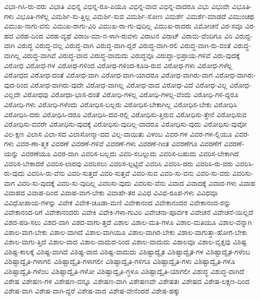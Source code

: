 {ವಿಭಾ-ಗಿಸಿ-ರು-ವರು
ವಿಭಾತಿ
ವಿಭಿನ್ನ
ವಿಭಿನ್ನ-ರೂ-ಪಿಯೂ
ವಿಭಿನ್ನ-ವಾದ
ವಿಭಿನ್ನ-ವಾದರೂ
ವಿಭು
ವಿಭುವೇ
ವಿಭೂತಿ-ಗಳು
ವಿಭೂತಿ-ಗಳೆಲ್ಲ
ವಿಮರ್ಶಿ-ಸು-ತ್ತಿಲ್ಲ
ವಿಮರ್ಶಿ-ಸುವ
ವಿಮರ್ಶಿ-ಸೋಣ
ವಿಮರ್ಶೆ
ವಿಮರ್ಶೆ-ಮಾಡದೆ
ವಿಮುಂಚಥ
ವಿಮುಖ-ನಾಗು-ವನು
ವಿಮುಖ-ರಾಗು-ವಿರಿ
ವಿಮುಖ-ರಾ-ಗು-ವುದಿಲ್ಲ
ವಿಮುಖ-ರಾದರು
ವಿಮೋಚನೆ
ವಿರ-ಸವೂ
ವಿರ-ಹದ
ವಿರಹ-ದಿಂದ
ವಿರಹ-ವ್ಯಥೆ
ವಿರಾಜ-ಮಾ-ನ-ಳಾಗಿ-ರುವಳು
ವಿರಾಟನ
ವಿರಾಟ್
ವಿರಾಮ-ವೆಂದಿಗೂ
ವಿರಿ
ವಿರುದ್ದ-ವಾಗಿ
ವಿರುದ್ಧ
ವಿರುದ್ಧ-ವಲ್ಲ
ವಿರುದ್ಧ-ವಾಗಿ
ವಿರುದ್ಧ-ವಾಗಿ-ದ್ದರೆ
ವಿರುದ್ಧ-ವಾಗಿ-ರಲಿ
ವಿರುದ್ಧ-ವಾಗಿ-ರು-ವಂತೆ
ವಿರುದ್ಧ-ವಾಗಿಲ್ಲ
ವಿರುದ್ಧ-ವಾಗಿವೆ
ವಿರುದ್ಧ-ವಾದ
ವಿರುದ್ಧ-ವಾದುದು
ವಿರುದ್ಧವೂ
ವಿರುದ್ಧಾ-ಭಿಪ್ರಾಯ-ಗಳಿವೆ
ವಿರು-ವುದಕ್ಕೆ
ವಿರೋಧ
ವಿರೋಧ-ಗಳ
ವಿರೋಧ-ಗಳಿಂದ
ವಿರೋಧ-ಗಳಿಂದ-ಕೂಡಿ-ರುವ
ವಿರೋಧ-ಗಳು
ವಿರೋಧ-ಗಳೆಲ್ಲ
ವಿರೋಧದ
ವಿರೋಧ-ದಂತೆ
ವಿರೋಧ-ವಾಗಿ
ವಿರೋಧ-ವಾಗಿ-ಯಾದರೂ
ವಿರೋಧ-ವಾಗಿರು-ವಾಗ
ವಿರೋಧ-ವಾಗಿರು-ವುದ-ರಿಂದ
ವಿರೋಧ-ವಾಗಿರು-ವುದೇ
ವಿರೋಧ-ವಾಗಿಲ್ಲ
ವಿರೋಧ-ವಾದ
ವಿರೋಧ-ವಿದೆ
ವಿರೋಧ-ವಿಲ್ಲ
ವಿರೋಧ-ವಿಲ್ಲದೇ
ವಿರೋಧವು
ವಿರೋಧಾ-ಭಾಸ-ದಂತೆ
ವಿರೋಧಿ-ಗಳಲ್ಲ
ವಿರೋಧಿ-ಗಳಲ್ಲ-ವೆಂದು
ವಿರೋಧಿ-ಗಳಿ-ದ್ದರೂ
ವಿರೋಧಿ-ಗಳು
ವಿರೋಧಿ-ಗಳೆಂದು
ವಿರೋಧಿಸ-ಬಲ್ಲರು
ವಿರೋಧಿಸ-ಬೇಕಾಗಿಲ್ಲ
ವಿರೋಧಿಸ-ಬೇಕು
ವಿರೋಧಿಸಿ
ವಿರೋಧಿಸಿ-ದರು
ವಿರೋಧಿಸಿ-ದರೂ
ವಿರೋಧಿಸಿ-ದವ-ರಲ್ಲಿ
ವಿರೋಧಿಸು-ತ್ತಿರುವ
ವಿರೋಧಿಸು-ತ್ತೇನೆ
ವಿರೋಧಿಸುವ
ವಿರೋಧಿಸು-ವವರೇ
ವಿರೋಧಿಸು-ವುದಕ್ಕೆ
ವಿರೋಧಿಸು-ವುದಿಲ್ಲ-ವಾದರೂ
ವಿರೋಧಿಸು-ವುದು
ವಿರೋಧಿಸು-ವುವೋ
ವಿಲ-ಕ್ಷಣ
ವಿಲಾಸ
ವಿಲಾ-ಸದ
ವಿಲಾಸೋನ್ಮಾ-ದದ
ವಿಲ್ಲ-ವಾಯಿತು
ವಿಳಂಬ
ವಿವರ-ಗಳ
ವಿವರ-ಗಳ-ಲ್ಲಿಯೂ
ವಿವರ-ಗಳು
ವಿವರ-ಣಾ-ತ್ಮಕ
ವಿವರಣೆ
ವಿವರಣೆ-ಗಳಿವೆ
ವಿವರಣೆ-ಗಳು
ವಿವರಣೆ-ಗಿಂತ
ವಿವರಣೆಗೂ
ವಿವರಣೆಗೆ
ವಿವರಣೆ-ಯನ್ನು
ವಿವರಣೆಯೂ
ವಿವರ-ವಾಗಿ
ವಿವರಿಸ-ಬಲ್ಲದು
ವಿವರಿ-ಸಬಲ್ಲುದು
ವಿವರಿಸ-ಬಹುದು
ವಿವರಿಸ-ಬೇಕಾಗಿದೆ
ವಿವರಿಸ-ಬೇಕಾದರೆ
ವಿವರಿಸ-ಲಾರವು
ವಿವರಿಸಲು
ವಿವರಿಸ-ಲ್ಪಟ್ಟಿವೆ
ವಿವರಿಸಿ
ವಿವರಿಸಿ-ದರು
ವಿವರಿಸಿ-ರು-ವರು
ವಿವರಿಸಿ-ರು-ವುದು
ವಿವರಿಸಿ-ರು-ವೆನು
ವಿವರಿ-ಸುತ್ತದೆ
ವಿವರಿ-ಸುತ್ತವೆ
ವಿವರಿ-ಸುವ
ವಿವರಿ-ಸು-ವನು
ವಿವರಿ-ಸು-ವರು
ವಿವರಿಸು-ವಾಗ
ವಿವರಿ-ಸು-ವುದಕ್ಕೆ
ವಿವರಿ-ಸು-ವುದಿಲ್ಲ
ವಿವರಿಸು-ವುದು
ವಿವರಿಸು-ವೆನು
ವಿವಾದ
ವಿವಾದಕ್ಕೆ
ವಿವಾದ-ಗಳು
ವಿವಾಹ
ವಿವಾಹದ
ವಿವಾಹ-ದಿಂದ
ವಿವಾಹ-ವಾಗ-ಬೇಕು
ವಿವಾಹೇ-ತರ
ವಿವಿಧ
ವಿವಿಧ-ರೂಪ-ಗಳು
ವಿವಿಧವೂ
ವಿವಿಧೋಪಾಯ-ಗಳನ್ನು
ವಿವೇಕ
ವಿವೇಕ-ಚೂಡಾ-ಮಣಿ
ವಿವೇಕಾನಂದ
ವಿವೇಕಾನಂದರ
ವಿವೇಕಾನಂದ-ರನ್ನು
ವಿವೇಕಾನಂದ-ರಿಗೆ
ವಿವೇಕಾನಂದರು
ವಿವೇಕಿ
ವಿವೇಕಿ-ಗಳಾ-ಗುವಿರಿ
ವಿವೇಚನಾ-ಪೂರ್ವಕ
ವಿವೇಚನೆ
ವಿವೇಚನೆ-ಯಿಲ್ಲದೆ
ವಿಶದ-ಪಡಿ-ಸಲು
ವಿಶದ-ವಾಗಿ
ವಿಶದ-ವಾಗು-ತ್ತದೆ
ವಿಶಾಲ
ವಿಶಾಲ-ಮತಿ-ಗಳೂ
ವಿಶಾಲ-ಮತಿಯೂ
ವಿಶಾಲ-ವನ್ನಾಗಿ
ವಿಶಾಲ-ವಾಗ-ಬೇಕು
ವಿಶಾಲ-ವಾಗಿದೆ
ವಿಶಾಲ-ವಾಗಿಯೂ
ವಿಶಾಲ-ವಾಗಿರ-ಬೇಕು
ವಿಶಾಲ-ವಾಗುತ್ತಾ-ಹೋಗ-ಬೇಕು
ವಿಶಾಲ-ವಾಗು-ತ್ತಿದೆ
ವಿಶಾಲ-ವಾದ
ವಿಶಾಲ-ವಾದುದ-ರಿಂದ
ವಿಶಾಲ-ವಾದುದು
ವಿಶಾಲವೂ
ವಿಶಾಲ-ವೃಕ್ಷವು
ವಿಶಿಷ್ಟ
ವಿಶಿಷ್ಟ-ಕಾಲಕ್ಕೆ
ವಿಶಿಷ್ಟ-ವಾಗಿದೆ
ವಿಶಿಷ್ಟ-ವಾದ
ವಿಶಿಷ್ಟ-ವಾದುದು
ವಿಶಿಷ್ಟಾದ್ವೈತ
ವಿಶಿಷ್ಟಾದ್ವೈತ-ಗಳ
ವಿಶಿಷ್ಟಾದ್ವೈತ-ಗಳೆಂಬ
ವಿಶಿಷ್ಟಾದ್ವೈತಿ-ಗಳಾಗಲಿ
ವಿಶಿಷ್ಟಾದ್ವೈತಿ-ಗಳಾಗಲೀ
ವಿಶಿಷ್ಟಾದ್ವೈತಿ-ಗಳಿಗೂ
ವಿಶಿಷ್ಟಾದ್ವೈತಿ-ಗಳು
ವಿಶಿಷ್ಟಾದ್ವೈತಿ-ಗಳೂ
ವಿಶಿಷ್ಟಾದ್ವೈತಿ-ಗಳೆಂಬ
ವಿಶಿಷ್ಟಾದ್ವೈತಿ-ಗಳೋ
ವಿಶಿಷ್ಟಾದ್ವೈತಿ-ಗ್ಧಳೂ
ವಿಶಿಷ್ಟಾದ್ವೈತಿ-ಯಾಗಲೀ
ವಿಶುದ್ಧ
ವಿಶುದ್ಧ-ವಾಗಿದೆ
ವಿಶೇಷ
ವಿಶೇಷಣ-ಗಳ
ವಿಶೇಷಣ-ವನ್ನೂ
ವಿಶೇಷಣ-ವಾಗಿ
ವಿಶೇಷಣವೇ
ವಿಶೇಷತಃ
ವಿಶೇಷದ
ವಿಶೇಷ-ಲಕ್ಷಣ-ದಿಂದ
ವಿಶೇಷ-ವಾಗಿ
ವಿಶೇಷ-ವಾಗಿ-ದ್ದರೆ
ವಿಶೇಷ-ವಾದ
ವಿಶೇಷ-ವೇನೆಂದರೆ
ವಿಶೇಷ-ಹಕ್ಕು
}
